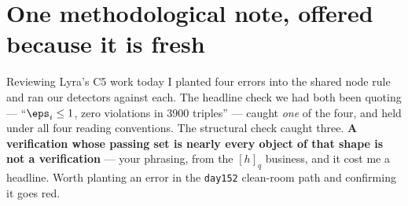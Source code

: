 \documentclass[11pt,a4paper]{article}
\begin{document}
\section{One methodological note, offered because it is fresh}
Reviewing Lyra's C5 work today I planted four errors into the shared node rule and ran our
detectors against each. The headline check we had both been quoting --- ``$\eps_i\le1$, zero
violations in 3900 triples'' --- caught \emph{one} of the four, and held under all four
reading conventions. The structural check caught three. \textbf{A verification whose passing
set is nearly every object of that shape is not a verification} --- your phrasing, from the
$[h]_q$ business, and it cost me a headline. Worth planting an error in the \texttt{day152}
clean-room path and confirming it goes red.
\end{document}
